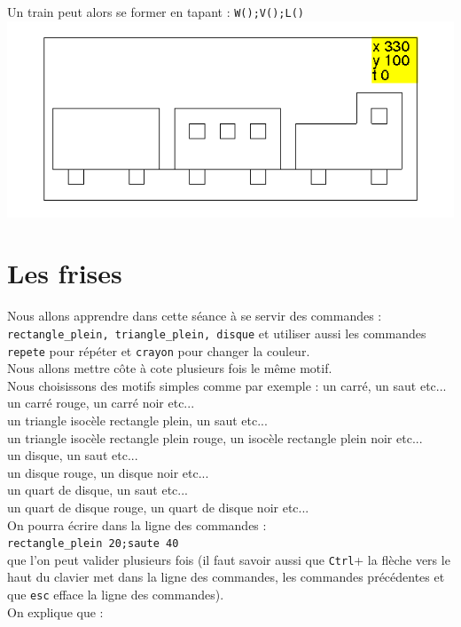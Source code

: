 \documentclass[a4paper,11pt]{book}
\begin{document}
Un train peut alors se former en tapant :
{\tt  W();V();L()}\\

\includegraphics[width=\textwidth]{tortuetrain}
\section{Les frises}
Nous allons apprendre dans cette s\'eance \`a se servir des commandes :\\
{\tt rectangle\_plein, triangle\_plein, disque} et utiliser aussi les commandes
 {\tt repete} pour r\'ep\'eter et {\tt crayon} pour changer la couleur.\\
Nous allons mettre c\^ote \`a cote plusieurs fois le m\^eme motif.\\
Nous choisissons des motifs simples comme par exemple :
un carr\'e, un saut etc...\\
un carr\'e rouge, un carr\'e noir etc...\\
un triangle isoc\`ele rectangle plein, un saut etc...\\
un triangle isoc\`ele rectangle plein rouge, un  isoc\`ele rectangle plein noir etc...\\
un disque, un saut etc...\\
un disque rouge, un disque noir etc...\\
un quart de disque, un saut etc...\\
un quart de disque rouge, un quart de disque noir etc...\\
On pourra  \'ecrire dans la ligne des commandes :\\
{\tt rectangle\_plein 20;saute 40}\\
que l'on peut valider plusieurs fois (il faut savoir aussi que  {\tt Ctrl}+
la fl\`eche vers le haut du clavier met dans la ligne des commandes, les 
commandes pr\'ec\'edentes et que {\tt esc} efface la ligne des commandes).\\
On explique que :\\
\end{document}
